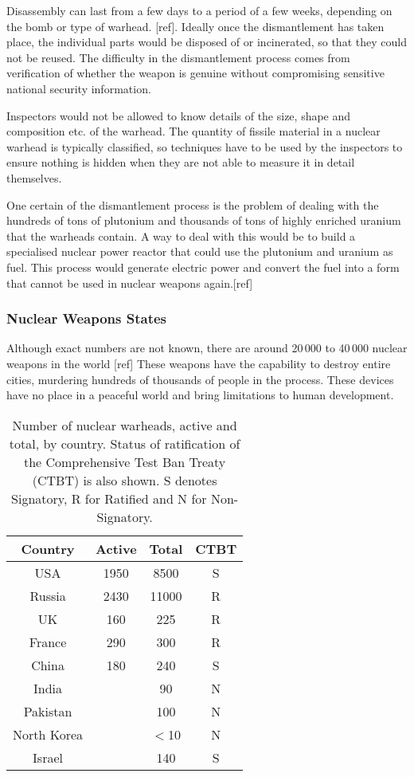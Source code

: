 \documentclass[twoside,titlepage,11pt,twocolumn,a4paper]{article}
\begin{document}
Disassembly can last from a few days to a period of a few weeks,
depending on the bomb or type of warhead. [ref]. Ideally once the
dismantlement has taken place, the individual parts would be disposed
of or incinerated, so that they could not be reused. The difficulty in
the dismantlement process comes from verification of whether the
weapon is genuine without compromising sensitive national security
information.

Inspectors would not be allowed to know details of the size, shape and
composition etc. of the warhead. The quantity of fissile material in a
nuclear warhead is typically classified, so techniques have to be used
by the inspectors to ensure nothing is hidden when they are not able
to measure it in detail themselves.

One certain of the dismantlement process is the problem of dealing
with the hundreds of tons of plutonium and thousands of tons of highly
enriched uranium that the warheads contain. A way to deal with this
would be to build a specialised nuclear power reactor that could use
the plutonium and uranium as fuel. This process would generate
electric power and convert the fuel into a form that cannot be used in
nuclear weapons again.[ref]

\subsubsection{Nuclear Weapons States}
Although exact numbers are not known, there are around 20\,000 to
40\,000 nuclear weapons in the world [ref] These weapons have the
capability to destroy entire cities, murdering hundreds of thousands
of people in the process. These devices have no place in a peaceful
world and bring limitations to human development.

\begin{table}
  \begin{tabular}{|c|c|c|c|}
    \hline
    Country	& Active& Total		& CTBT	\\
    \hline
    USA		& 1950 	& 8500		& S	\\
    Russia	& 2430 	& 11000		& R	\\
    UK		& 160 	& 225		& R	\\
    France	& 290	& 300		& R	\\
    China	& 180	& 240		& S	\\
    India	&	& 90		& N	\\
    Pakistan	&	& 100		& N	\\
    North Korea	&	& \(<\)10	& N	\\
    Israel	&	& 140		& S	\\
    \hline
  \end{tabular}
  \caption{Number of nuclear warheads, active and total, by
    country. Status of ratification of the Comprehensive Test Ban
    Treaty (CTBT) is also shown. S denotes Signatory, R for
    Ratified and N for Non-Signatory.}
  \label{tab:NWSwarheadsCTBT}
\end{table}
\end{document}
